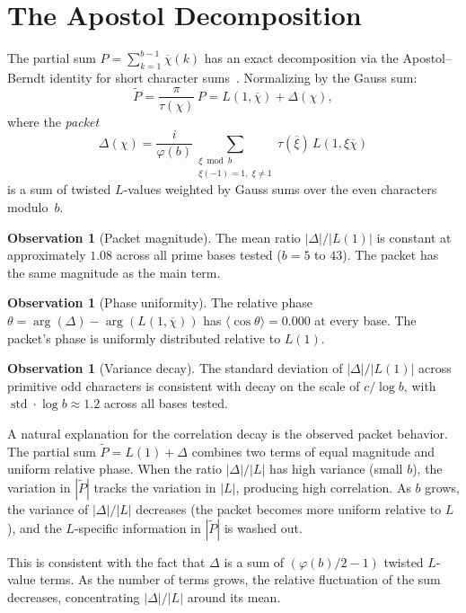 \documentclass[12pt]{amsart}
\theoremstyle{definition}
\newtheorem{observation}[theorem]{Observation}
\theoremstyle{remark}
\begin{document}
\section{The Apostol Decomposition}

The partial sum $P = \sum_{k=1}^{b-1}
\overline{\chi}(k)$ has an exact decomposition
via the Apostol--Berndt identity for short character
sums~\cite{davenport}. Normalizing by the Gauss sum:
\[
\widetilde{P} = \frac{\pi}{\tau(\chi)}\, P
= L(1, \overline{\chi}) + \Delta(\chi),
\]
where the \emph{packet}
\[
\Delta(\chi) = \frac{i}{\varphi(b)}
\sum_{\substack{\xi \bmod b \\ \xi(-1) = 1,\;
\xi \ne 1}} \tau(\overline{\xi})\,
L(1, \xi\overline{\chi})
\]
is a sum of twisted $L$-values weighted by Gauss
sums over the even characters modulo~$b$.

\begin{observation}[Packet magnitude]
The mean ratio $|\Delta| / |L(1)|$ is constant at
approximately $1.08$ across all prime bases tested
($b = 5$ to $43$). The packet has the same magnitude
as the main term.
\end{observation}

\begin{observation}[Phase uniformity]
The relative phase
$\theta = \arg(\Delta) - \arg(L(1, \overline{\chi}))$
has $\langle \cos\theta \rangle = 0.000$ at every base.
The packet's phase is uniformly distributed relative to
$L(1)$.
\end{observation}

\begin{observation}[Variance decay]
The standard deviation of $|\Delta| / |L(1)|$ across
primitive odd characters is consistent with decay on
the scale of $c / \log b$, with
$\operatorname{std} \cdot \log b \approx 1.2$ across
all bases tested.
\end{observation}

A natural explanation for the correlation decay is
the observed packet behavior. The partial sum $\widetilde{P}
= L(1) + \Delta$ combines two terms of equal
magnitude and uniform relative phase. When the ratio
$|\Delta|/|L|$ has high variance (small $b$), the
variation in $|\widetilde{P}|$ tracks the variation
in $|L|$, producing high correlation. As $b$ grows,
the variance of $|\Delta|/|L|$ decreases (the packet
becomes more uniform relative to $L$), and the
$L$-specific information in $|\widetilde{P}|$ is
washed out.

This is consistent with the fact that $\Delta$ is a sum of
$(\varphi(b)/2 - 1)$ twisted $L$-value terms. As the
number of terms grows, the relative fluctuation of
the sum decreases, concentrating
$|\Delta|/|L|$ around its mean.
\end{document}
